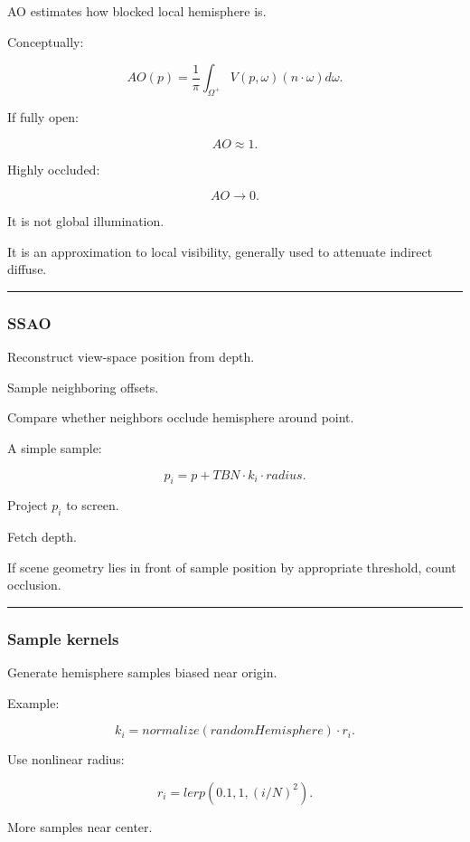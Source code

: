 AO estimates how blocked local hemisphere is.

Conceptually:

\[
\boxed{
AO(p)
=
\frac1\pi
\int_{\Omega^+}
V(p,\omega)
(n\cdot\omega)
d\omega.
}
\]

If fully open:

\[
AO\approx1.
\]

Highly occluded:

\[
AO\rightarrow0.
\]

It is not global illumination.

It is an approximation to local visibility, generally used to attenuate indirect diffuse.

\begin{center}\rule{0.5\linewidth}{0.5pt}\end{center}

\subsubsection{SSAO}\label{ssao}

Reconstruct view-space position from depth.

Sample neighboring offsets.

Compare whether neighbors occlude hemisphere around point.

A simple sample:

\[
p_i=
p+
TBN\cdot k_i\cdot radius.
\]

Project \(p_i\) to screen.

Fetch depth.

If scene geometry lies in front of sample position by appropriate threshold, count occlusion.

\begin{center}\rule{0.5\linewidth}{0.5pt}\end{center}

\subsubsection{Sample kernels}\label{sample-kernels}

Generate hemisphere samples biased near origin.

Example:

\[
k_i=
normalize(randomHemisphere)
\cdot r_i.
\]

Use nonlinear radius:

\[
r_i=
lerp(
0.1,
1,
(i/N)^2
).
\]

More samples near center.

